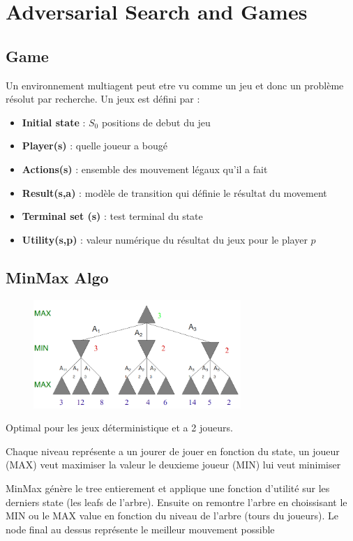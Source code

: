 			
\section{Adversarial Search and Games}
	\subsection{Game}
		Un environnement multiagent peut etre vu comme un jeu et donc un problème résolut par recherche.
		Un jeux est défini par :
		\begin{itemize}
			\item \textbf{Initial state} : $S_0$ positions de debut du jeu
			\item \textbf{Player(s)} : quelle joueur a bougé
			\item \textbf{Actions(s)} : ensemble des mouvement légaux qu'il a fait
			\item \textbf{Result(s,a)} : modèle de transition qui définie le résultat du movement
			\item \textbf{Terminal set (s)} : test terminal du state
			\item \textbf{Utility(s,p)} :  valeur numérique du résultat du jeux pour le player $p$
		\end{itemize}
		
	\subsection{MinMax Algo}
	
		\begin{figure}[htp]
			\centering
			\includegraphics[width=0.7\textwidth]{img/minmax.png}
		\end{figure}
		
		Optimal pour les jeux déterministique et a 2 joueurs. 
		
		Chaque niveau représente a un jourer de jouer en fonction du state, un joueur (MAX) veut maximiser la valeur le deuxieme joueur (MIN) lui veut minimiser
		
		MinMax génère le tree entierement et applique une fonction d'utilité sur les derniers state (les leafs de l'arbre). Ensuite on remontre l'arbre en choissisant le MIN ou le MAX value en fonction du niveau de l'arbre (tours du joueurs). Le node final au dessus représente le meilleur mouvement possible

